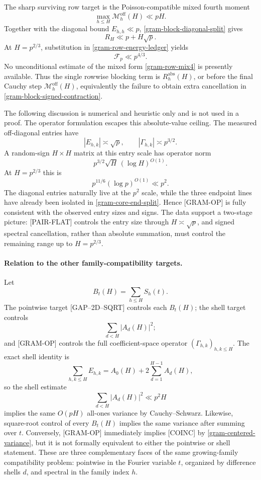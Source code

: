 \begin{remark}
The sharp surviving row target is the Poisson-compatible mixed fourth
moment
\begin{equation}
 \boxed{
 \max_{h\le H}\mathcal M_h^{\mathrm{off}}(H)\ll pH.}
 \tag{ROW-MIX4}
 \label{gram-row-mix4}
\end{equation}
Together with the diagonal bound $E_{h,h}\ll p$,
\eqref{gram-block-diagonal-split} gives
\[
 R_H\ll p+H\sqrt p.
\]
At $H=p^{2/3}$, substitution in
\eqref{gram-row-energy-ledger} yields
\[
 \mathcal F_p\ll p^{4/3}.
\]
No unconditional estimate of the mixed form
\eqref{gram-row-mix4} is presently available.  Thus the single rowwise
blocking term is $R_h^{\mathrm{abs}}(H)$, or before the final Cauchy step
$\mathcal M_h^{\mathrm{off}}(H)$, equivalently the failure to obtain
extra cancellation in \eqref{gram-block-signed-contraction}.

The following discussion is numerical and heuristic only and is not
used in a proof.  The operator formulation escapes this absolute-value
ceiling.  The measured off-diagonal entries have
\[
 |E_{h,k}|\asymp\sqrt p,
 \qquad |\Gamma_{h,k}|\asymp p^{3/2}.
\]
A random-sign $H\times H$ matrix at this entry scale has operator norm
\[
 p^{3/2}\sqrt H\,(\log H)^{O(1)}.
\]
At $H=p^{2/3}$ this is
\[
 p^{11/6}(\log p)^{O(1)}\ll p^2.
\]
The diagonal entries naturally live at the $p^2$ scale, while the three
endpoint lines have already been isolated in
\eqref{gram-core-end-split}.  Hence \textup{[GRAM-OP]} is fully
consistent with the observed entry sizes and signs.  The data support a
two-stage picture: \textup{[PAIR-FLAT]} controls the entry size through
$H\asymp\sqrt p$, and signed spectral cancellation, rather than
absolute summation, must control the remaining range up to
$H=p^{2/3}$.
\end{remark}

\paragraph{Relation to the other family-compatibility targets.}
Let
\[
 B_t(H)=\sum_{h\le H}S_h(t).
\]
The pointwise target \textup{[GAP--2D--SQRT]} controls each $B_t(H)$;
the shell target controls
\[
 \sum_{d<H}|A_d(H)|^2;
\]
and \textup{[GRAM-OP]} controls the full coefficient-space operator
$(\Gamma_{h,k})_{h,k\le H}$.  The exact shell identity is
\[
 \sum_{h,k\le H}E_{h,k}
 =A_0(H)+2\sum_{d=1}^{H-1}A_d(H),
\]
so the shell estimate
\[
 \sum_{d<H}|A_d(H)|^2\ll p^2H
\]
implies the same $O(pH)$ all-ones variance by Cauchy--Schwarz.
Likewise, square-root control of every $B_t(H)$ implies the same variance
after summing over $t$.  Conversely, \textup{[GRAM-OP]} immediately
implies \textup{[COINC]} by
\eqref{gram-centered-variance}, but it is not formally equivalent to
either the pointwise or shell statement.  These are three complementary
faces of the same growing-family compatibility problem: pointwise in the
Fourier variable $t$, organized by difference shells $d$, and spectral
in the family index $h$.

